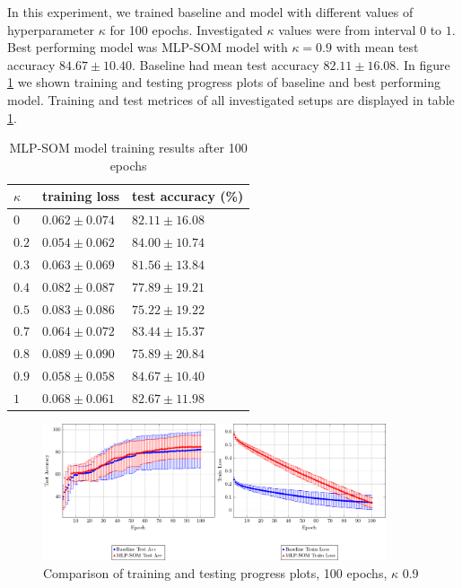 In this experiment, we trained baseline and model with different values of hyperparameter $\kappa$ for 100 epochs. Investigated $\kappa$ values were from interval $0$ to $1$. Best performing model was MLP-SOM model with $\kappa = 0.9$ with mean test accuracy $84.67 \pm 10.40$. Baseline had mean test accuracy $82.11	\pm 16.08$. In figure \ref{exp1-graphs} we shown training and testing progress plots of baseline and best performing model. Training and test metrices of all investigated setups are displayed in table \ref{exp1-res-table}.


\begin{table}[h!]
\centering
\begin{tabular}{|l|l|l|}
\hline
$\kappa$        & training loss & test accuracy (\%) \\ \hline
\color{purple} $0$   &  \color{purple}  $0.062	\pm 0.074 $  & \color{purple}  $82.11	\pm 16.08$  \\ \hline
$0.2$ &   $0.054	\pm 0.062 $  &  $84.00	\pm 10.74$  \\ \hline
$0.3$ &   $0.063	\pm 0.069 $  &  $81.56	\pm 13.84$  \\ \hline
$0.4$ &   $0.082	\pm 0.087 $  &  $77.89	\pm 19.21$  \\ \hline
$0.5$ &   $0.083	\pm 0.086 $  &  $75.22	\pm 19.22$  \\ \hline
$0.7$ &   $0.064	\pm 0.072 $  &  $83.44	\pm 15.37$  \\ \hline
$0.8$ &   $0.089	\pm 0.090 $  &  $75.89	\pm 20.84$  \\ \hline
\color{purple} $0.9$ &  \color{purple}  $0.058	\pm 0.058 $  & \color{purple}  $84.67	\pm 10.40$  \\ \hline
$1$   &   $0.068	\pm 0.061 $  &  $82.67	\pm 11.98$  \\ \hline
\end{tabular}
\caption{MLP-SOM model training results after 100 epochs}
\label{exp1-res-table}
\end{table}


\begin{figure}[h!]
    \centering
    \includegraphics[width=0.9\textwidth]{figs/baseline-model-tr-test-metrices-15hid-100eps-0.9k.pdf}
    \caption{Comparison of training and testing progress plots, 100 epochs, $\kappa$ 0.9}
    \label{exp1-graphs}
\end{figure}

